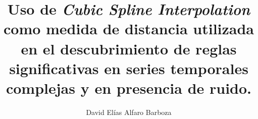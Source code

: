 \title{Uso de \textit{Cubic Spline Interpolation} como medida de distancia utilizada en el descubrimiento de reglas significativas en series temporales complejas y en presencia de ruido.}
\author{David El\'ias Alfaro Barboza}
\maketitle
\cleardoublepage
\setcounter{savepage}{\thepage}
\begin{abstractpage}

\end{abstractpage}
